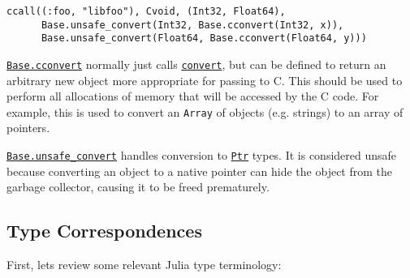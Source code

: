 \begin{verbatim}
ccall((:foo, "libfoo"), Cvoid, (Int32, Float64),
      Base.unsafe_convert(Int32, Base.cconvert(Int32, x)),
      Base.unsafe_convert(Float64, Base.cconvert(Float64, y)))
\end{verbatim}



\hyperlink{16487788729383051927}{\texttt{Base.cconvert}} normally just calls \hyperlink{1846942650946171605}{\texttt{convert}}, but can be defined to return an arbitrary new object more appropriate for passing to C. This should be used to perform all allocations of memory that will be accessed by the C code. For example, this is used to convert an \texttt{Array} of objects (e.g. strings) to an array of pointers.



\hyperlink{6011318385865707029}{\texttt{Base.unsafe\_convert}} handles conversion to \hyperlink{10630331440513004826}{\texttt{Ptr}} types. It is considered unsafe because converting an object to a native pointer can hide the object from the garbage collector, causing it to be freed prematurely.



\hypertarget{11183503169412025304}{}


\subsection{Type Correspondences}



First, let{\textquotesingle}s review some relevant Julia type terminology:




